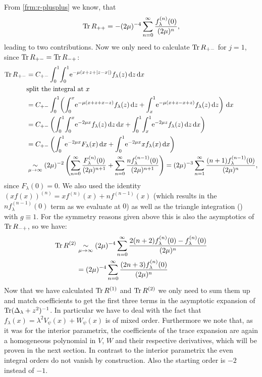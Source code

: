 From \cref{frm:r-plusplus} we know, that 
\begin{equation*}
  \operatorname{Tr} R_{++} = -(2\mu)^{-4}\sum_{n=0}^\infty \frac{f^{(n)}_\lambda(0)}{(2\mu)^n},
\end{equation*}
leading to two contributions. Now we only need to calculate $\operatorname{Tr} R_{+-}$ for
$j=1$, since $\operatorname{Tr} R_{+-} = \operatorname{Tr} R_{-+}$:
\begin{align*}
  \Tr R_{+-} &= C_{+-} \Int{x}{
      \Int{z}{
        \Eto{-\mu(x+z+\Abs{z-x})}
        f_\lambda(z)
      }
    } \\
    &\text{split the integral at $x$} \\
    &= C_{+-} \Int{x}{
      \left(
        \Integ[x]{0}{z}{
          \Eto{-\mu(x+z+x-z)} f_\lambda(z)
        }
      + \Integ[1]{x}{z}{
          \Eto{-\mu(x+z-x+z)} f_\lambda(z)
        }
      \right)
    } \\
    &= C_{+-} \left(\Int{x}{\Integ[x]{0}{z}{\Eto{-2\mu x} f_\lambda(z)}}
    + \Int{x}{\Integ[1]{x}{z}{\Eto{-2\mu z}f_\lambda(z)}} \right) \\
    &= C_{+-} \left(
      \Int{x}{\Eto{-2\mu x} F_\lambda(x)}
      + \Int{x}{\Eto{-2\mu x} xf_\lambda(x)}
      \right) \\
    &\SimAs{\mu\to\infty} %
      (2\mu)^{-2}\left(
      \Wsum{F_\lambda^{(n)}} + \Wsum{nf_\lambda^{(n-1)}}\right)
      = (2\mu)^{-3} \sum_{n=1}^\infty\frac{(n+1)f_\lambda^{(n-1)}(0)}{(2\mu)^n},
\end{align*}
since $F_\lambda(0) = 0$. We also used the identity $(xf(x))^{(n)} = xf^{(n)}(x)
+ nf^{(n-1)}(x)$ (which results in the $nf_\lambda^{(n-1)}(0)$ term as we
evaluate at $0$) as well as the triangle integration
() with $g \equiv 1$.  For the symmetry reasons
given above this is also the asymptotics of $\operatorname{Tr} R_{-+}$, so we have:
\begin{equation}
  \label{eqn:tr2}
  \begin{split}
    \operatorname{Tr} R^{(2)} &\mathrel{\underset{\mu\to\infty}{\sim}} (2\mu)^{-4} \sum_{n=0}^\infty
  \frac{2(n+2)f_\lambda^{(n)}(0) - f^{(n)}_\lambda(0)}{(2\mu)^n} \\ &=
    (2\mu)^{-4} \sum_{n=0}^\infty \frac{(2n + 3)f_\lambda^{(n)}(0)}{(2\mu)^n}
  \end{split}
\end{equation}
Now that we have calculated $\operatorname{Tr} R^{(1)}$ and $\operatorname{Tr} R^{(2)}$ we only need to sum
them up and match coefficients to get the first three terms in the asymptotic
expansion of $\operatorname{Tr}(\Delta_\lambda + z^2)^{-1}$. In particular we have to deal
with the fact that $f_\lambda(x) = \lambda^2 V_\psi(x) + W_\psi(x)$ is of mixed
order.  Furthermore we note that, as it was for the interior parametrix, the
coefficients of the trace expansion are again a homogeneous polynomial in $V$,
$W$ and their respective derivatives, which will be proven in the next section.
In contrast to the interior parametrix the even integral orders do not vanish by
construction. Also the starting order is $-2$ instead of $-1$.

